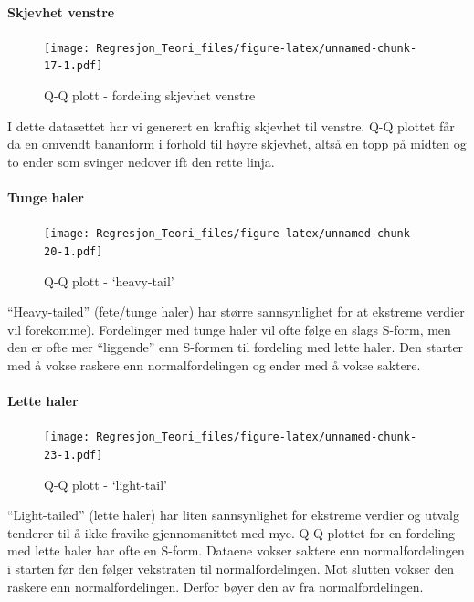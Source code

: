\documentclass[
]{article}
\begin{document}
\hypertarget{skjevhet-venstre}{%
\paragraph{Skjevhet venstre}\label{skjevhet-venstre}}

\begin{figure}
\centering
\texttt{[image: Regresjon\_Teori\_files/figure-latex/unnamed-chunk-17-1.pdf]}
\caption{Q-Q plott - fordeling skjevhet venstre}
\end{figure}

I dette datasettet har vi generert en kraftig skjevhet til venstre. Q-Q
plottet får da en omvendt bananform i forhold til høyre skjevhet, altså
en topp på midten og to ender som svinger nedover ift den rette linja.

\hypertarget{tunge-haler}{%
\paragraph{Tunge haler}\label{tunge-haler}}

\begin{figure}
\centering
\texttt{[image: Regresjon\_Teori\_files/figure-latex/unnamed-chunk-20-1.pdf]}
\caption{Q-Q plott - `heavy-tail'}
\end{figure}

``Heavy-tailed'' (fete/tunge haler) har større sannsynlighet for at
ekstreme verdier vil forekomme). Fordelinger med tunge haler vil ofte
følge en slags S-form, men den er ofte mer ``liggende'' enn S-formen til
fordeling med lette haler. Den starter med å vokse raskere enn
normalfordelingen og ender med å vokse saktere.

\hypertarget{lette-haler}{%
\paragraph{Lette haler}\label{lette-haler}}

\begin{figure}
\centering
\texttt{[image: Regresjon\_Teori\_files/figure-latex/unnamed-chunk-23-1.pdf]}
\caption{Q-Q plott - `light-tail'}
\end{figure}

``Light-tailed'' (lette haler) har liten sannsynlighet for ekstreme
verdier og utvalg tenderer til å ikke fravike gjennomsnittet med mye.
Q-Q plottet for en fordeling med lette haler har ofte en S-form. Dataene
vokser saktere enn normalfordelingen i starten før den følger vekstraten
til normalfordelingen. Mot slutten vokser den raskere enn
normalfordelingen. Derfor bøyer den av fra normalfordelingen.
\end{document}
